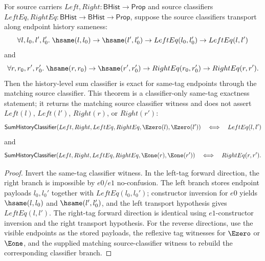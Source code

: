 \begin{theorem}
\label{thm:sum-history-classifier-source-same-tag-exactness}
For source carriers $Left,Right:\mathsf{BHist}\to\mathsf{Prop}$ and source classifiers
$LeftEq,RightEq:\mathsf{BHist}\to\mathsf{BHist}\to\mathsf{Prop}$, suppose the source classifiers
transport along endpoint history sameness:
$$
\forall l,l_0,l',l_0'.\;
\hsame(l,l_0)\to\hsame(l',l_0')\to LeftEq(l_0,l_0')\to LeftEq(l,l')
$$
and
$$
\forall r,r_0,r',r_0'.\;
\hsame(r,r_0)\to\hsame(r',r_0')\to RightEq(r_0,r_0')\to RightEq(r,r').
$$
Then the history-level sum classifier is exact for same-tag endpoints through
the matching source classifier. This theorem is a classifier-only same-tag
exactness statement; it returns the matching source classifier witness and does
not assert $Left(l)$, $Left(l')$, $Right(r)$, or $Right(r')$:
$$
\mathsf{SumHistoryClassifier}(Left,Right,LeftEq,RightEq,\Ezero(l),\Ezero(l'))
\quad\Longleftrightarrow\quad
LeftEq(l,l')
$$
and
$$
\mathsf{SumHistoryClassifier}(Left,Right,LeftEq,RightEq,\Eone(r),\Eone(r'))
\quad\Longleftrightarrow\quad
RightEq(r,r').
$$
\end{theorem}
\begin{proof}
Invert the same-tag classifier witness. In the left-tag forward direction, the
right branch is impossible by $e0/e1$ no-confusion. The left branch stores
endpoint payloads $l_0,l_0'$ together with $LeftEq(l_0,l_0')$; constructor
inversion for $e0$ yields $\hsame(l,l_0)$ and $\hsame(l',l_0')$, and the left
transport hypothesis gives $LeftEq(l,l')$. The right-tag forward direction is
identical using $e1$-constructor inversion and the right transport hypothesis.
For the reverse directions, use the visible endpoints as the stored payloads,
the reflexive tag witnesses for $\Ezero$ or $\Eone$, and the supplied matching
source-classifier witness to rebuild the corresponding classifier branch.
\end{proof}

